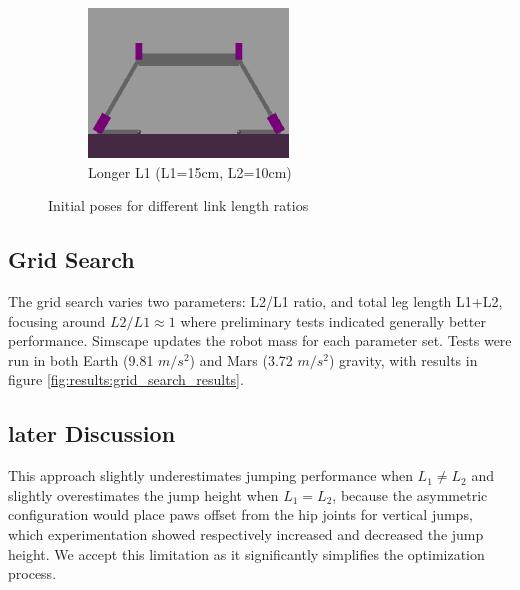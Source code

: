 \begin{figure}[h]
\begin{subfigure}[b]{0.32\textwidth}
        \centering
        \includegraphics[width=\textwidth]{Images/link_length_optimization/longer_L1_pose.png}
        \caption{Longer L1 (L1=15cm, L2=10cm)}
    \end{subfigure}
    \caption{Initial poses for different link length ratios}
    \label{fig:link_length_optimization:initial_poses}
\end{figure}



\subsection{Grid Search}
The grid search varies two parameters: L2/L1 ratio, and total leg length L1+L2, focusing around $L2/L1\approx1$ where preliminary tests indicated generally better performance. Simscape updates the robot mass for each parameter set. Tests were run in both Earth (9.81 $m/s^2$) and Mars (3.72 $m/s^2$) gravity, with results in figure \ref{fig:results:grid_search_results}.


\subsection{later Discussion}
This approach slightly underestimates jumping performance when \(L_1 \neq L_2\) and slightly overestimates the jump height when \(L_1 = L_2\), because the asymmetric configuration would place paws offset from the hip joints for vertical jumps, which experimentation showed respectively increased and decreased the jump height. We accept this limitation as it significantly simplifies the optimization process.
